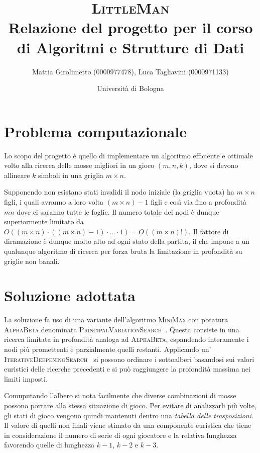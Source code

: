 \documentclass{article}
\title{\textsc{LittleMan}\\
\large Relazione del progetto per il corso di Algoritmi e Strutture di Dati}
\author{
  Mattia Girolimetto (0000977478),
  Luca Tagliavini (0000971133)
}
\date{
	Universit\`a di Bologna \\
  \displaydate{date}
}
\begin{document}
\maketitle

\section*{Problema computazionale}

Lo scopo del progetto \`e quello di implementare un algoritmo efficiente e ottimale
volto alla ricerca delle mosse migliori in un gioco $(m,n,k)$, dove si devono
allineare $k$ simboli in una griglia $m \times n$.

Supponendo non esistano stati invalidi il nodo iniziale (la griglia vuota)
ha $m \times n$ figli, i quali avranno a loro volta $(m \times n)-1$ figli e cos\`i
via fino a profondit\`a $mn$ dove ci saranno tutte le foglie. Il numero totale
dei nodi \`e dunque superiormente limitato da $O((m \times n) \cdot ((m \times n)-1)
\cdot \ldots \cdot 1) = O((m \times n)!)$.
Il fattore di diramazione \`e dunque molto alto ad ogni stato della partita,
il che impone a un qualunque algoritmo di ricerca per forza bruta la
limitazione in profondit\`a su griglie non banali. 

\section*{Soluzione adottata}

La soluzione fa uso di una variante dell'algoritmo \textsc{MiniMax} con potatura
\textsc{AlphaBeta} denominata \textsc{PrincipalVariationSearch}~\cite{negascout}. Questa
consiste in una ricerca limitata in profondit\`a analoga ad \textsc{AlphaBeta}, espandendo 
interamente i nodi pi\`u promettenti e parzialmente quelli restanti. Applicando
un' \textsc{IterativeDeepeningSearch}~\cite{id} si possono ordinare i sottoalberi
basandosi sui valori euristici delle ricerche precedenti e si pu\`o raggiungere
la profondit\`a massima nei limiti imposti.

Comuputando l'albero si nota facilmente che diverse combinazioni di
mosse possono portare alla stessa situazione di gioco.
Per evitare di analizzarli pi\`u volte, gli stati di gioco vengono quindi mantenuti 
dentro una \emph{tabella delle trasposizioni}. Il valore di quelli non finali
viene stimato da una componente euristica che tiene in considerazione il numero
di serie di ogni giocatore e la relativa lunghezza favorendo quelle di lunghezza
$k-1$, $k-2$ e $k-3$.
\end{document}
